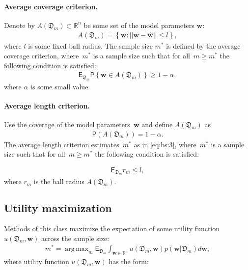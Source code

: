 \documentclass[
11pt,%
tightenlines,%
twoside,%
onecolumn,%
nofloats,%
nobibnotes,%
nofootinbib,%
superscriptaddress,%
noshowpacs,%
centertags]%
{revtex4}
\DeclareMathOperator*{\argmax}{arg\,max}
\begin{document}
\paragraph{Average coverage criterion.}
Denote by $A\left(\mathfrak{D}_{m}\right) \subset \mathbb{R}^n$ be some set of the model parameters $\textbf{w}$:
\[
\label{eq:bs:2}
\begin{aligned}
	A\left(\mathfrak{D}_{m}\right) = \left\{\textbf{w}:||\textbf{w} - \hat{\textbf{w}}||\leq l\right\},
\end{aligned}
\]
where $l$ is some fixed ball radius.
The sample size $m^*$ is defined by the average coverage criterion, where~$m^*$ is a sample size such that for all~$m \geq m^*$ the following condition is satisfied:
\[
\label{eq:bs:3}
\begin{aligned}
	\mathsf{E}_{\mathfrak{D}_m}\mathsf{P}\left\{\textbf{w} \in A\left(\mathfrak{D}_m\right)\right\} \geq 1-\alpha,
\end{aligned}
\]
where $\alpha$ is some small value.
	
\paragraph{Average length criterion.}
Use the coverage of the model parameters~$\textbf{w}$ and define $A\left(\mathfrak{D}_{m}\right)$ as
\[
\label{eq:bs:4}
\begin{aligned}
	\mathsf{P}\left(A\left(\mathfrak{D}_{m}\right)\right) =  1- \alpha.
\end{aligned}
\]
The average length criterion estimates~$m^*$ as in \eqref{eq:bs:3}, where~$m^*$ is a sample size such that for all~$m \geq m^*$ the following condition is satisfied:
	
\[
\label{eq:bs:5}
\begin{aligned}
	\mathsf{E}_{\mathfrak{D}_m}r_m\leq l,
\end{aligned}
\]
where $r_m$ is the ball radius $A\left(\mathfrak{D}_{m}\right)$.

\subsection{Utility maximization}
Methods of this class maximize the expectation of some utility function $u\left(\mathfrak{D}_{m}, \textbf{w}\right)$ across the sample size:
\[
\label{eq:bs:6}
\begin{aligned}
	m^* = \argmax_{m} \mathsf{E}_{\mathfrak{D}_m}\int_{\textbf{w}\in\mathbb{R}^{n}}u\left(\mathfrak{D}_m, \textbf{w}\right)p(\textbf{w}|\mathfrak{D}_m)d\textbf{w},
\end{aligned}
\]
where utility function $u\left(\mathfrak{D}_{m}, \textbf{w}\right)$ has the form:
\end{document}
